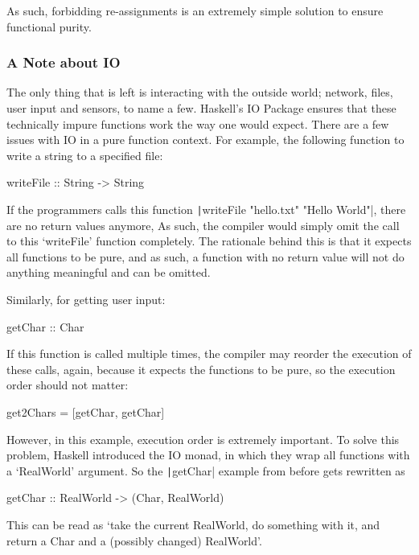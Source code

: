 As such, forbidding re-assignments is an extremely simple solution to
ensure functional purity.

\subsubsection{A Note about IO}
The only thing that is left is interacting with the outside world; network,
files, user input and sensors, to name a few. Haskell's IO Package ensures
that these technically impure functions work the way one would expect.
There are a few issues with IO in a pure function context. For example,
the following function to write a string to a specified file:

\begin{haskellcode}
	writeFile :: String -> String
\end{haskellcode}

If the programmers calls this function
\texttt|writeFile "hello.txt" "Hello World"|, there are
no return values anymore, As such, the compiler would simply omit the call
to this `writeFile' function completely. The rationale behind this is that
it expects all functions to be pure, and as such, a function with no return
value will not do anything meaningful and can be omitted.

Similarly, for getting user input:
\begin{haskellcode}
	getChar :: Char
\end{haskellcode}

If this function is called multiple times, the compiler may reorder the
execution of these calls, again, because it expects the functions to be
pure, so the execution order should not matter:
\begin{haskellcode}
	get2Chars = [getChar, getChar]
\end{haskellcode}

However, in this example, execution order is extremely important. To
solve this problem, Haskell introduced the IO monad, in which they
wrap all functions with a `RealWorld' argument. So the
\texttt|getChar| example from before gets rewritten as

\begin{haskellcode}
	getChar :: RealWorld -> (Char, RealWorld)
\end{haskellcode}

This can be read as `take the current RealWorld, do something with it,
and return a Char and a (possibly changed) RealWorld'\autocite{haskell-io}.

